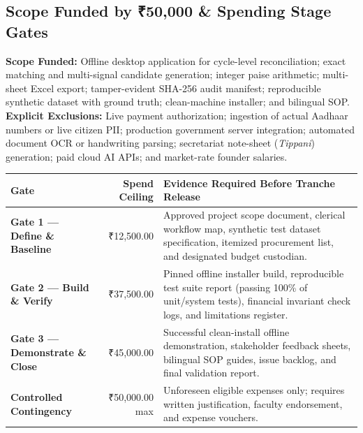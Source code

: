 \documentclass[11pt,a4paper]{article}
\begin{document}
\vspace{0.2cm}
\subsection{Scope Funded by ₹50,000 \& Spending Stage Gates}
\textbf{Scope Funded:} Offline desktop application for cycle-level reconciliation; exact matching and multi-signal candidate generation; integer paise arithmetic; multi-sheet Excel export; tamper-evident SHA-256 audit manifest; reproducible synthetic dataset with ground truth; clean-machine installer; and bilingual SOP.\\
\textbf{Explicit Exclusions:} Live payment authorization; ingestion of actual Aadhaar numbers or live citizen PII; production government server integration; automated document OCR or handwriting parsing; secretariat note-sheet (\textit{Tippani}) generation; paid cloud AI APIs; and market-rate founder salaries.

\vspace{0.15cm}
\noindent
\begin{tabularx}{\textwidth}{|l|r|Y|}
\hline
\textbf{Gate} & \textbf{Spend Ceiling} & \textbf{Evidence Required Before Tranche Release} \\
\hline
\textbf{Gate 1 — Define \& Baseline} & ₹12,500.00 & Approved project scope document, clerical workflow map, synthetic test dataset specification, itemized procurement list, and designated budget custodian. \\
\hline
\textbf{Gate 2 — Build \& Verify} & ₹37,500.00 & Pinned offline installer build, reproducible test suite report (passing 100\% of unit/system tests), financial invariant check logs, and limitations register. \\
\hline
\textbf{Gate 3 — Demonstrate \& Close} & ₹45,000.00 & Successful clean-install offline demonstration, stakeholder feedback sheets, bilingual SOP guides, issue backlog, and final validation report. \\
\hline
\textbf{Controlled Contingency} & ₹50,000.00 max & Unforeseen eligible expenses only; requires written justification, faculty endorsement, and expense vouchers. \\
\hline
\end{tabularx}

\vspace{0.2cm}

\end{document}
